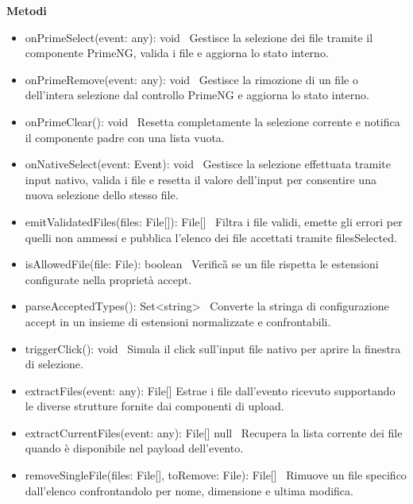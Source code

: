 \documentclass[a4paper,11pt]{article}
\begin{document}
\textbf{Metodi}

\begin{itemize}
\item onPrimeSelect(event: any): void \
Gestisce la selezione dei file tramite il componente PrimeNG, valida i file e aggiorna lo stato interno.

\item onPrimeRemove(event: any): void \
Gestisce la rimozione di un file o dell'intera selezione dal controllo PrimeNG e aggiorna lo stato interno.

\item onPrimeClear(): void \
Resetta completamente la selezione corrente e notifica il componente padre con una lista vuota.

\item onNativeSelect(event: Event): void \
Gestisce la selezione effettuata tramite input nativo, valida i file e resetta il valore dell'input per consentire una nuova selezione dello stesso file.

\item emitValidatedFiles(files: File[]): File[] \
Filtra i file validi, emette gli errori per quelli non ammessi e pubblica l'elenco dei file accettati tramite filesSelected.

\item isAllowedFile(file: File): boolean \
Verifica\G{} se un file rispetta le estensioni configurate nella proprietà accept.

\item parseAcceptedTypes(): Set<string> \
Converte la stringa di configurazione accept in un insieme di estensioni normalizzate e confrontabili.

\item triggerClick(): void \
Simula il click sull'input file nativo per aprire la finestra di selezione.

\item extractFiles(event: any): File[] 
Estrae i file dall'evento ricevuto supportando le diverse strutture fornite dai componenti di upload.

\item extractCurrentFiles(event: any): File[] \textbar{} null \
Recupera la lista corrente dei file quando è disponibile nel payload dell'evento.

\item removeSingleFile(files: File[], toRemove: File): File[] \
Rimuove un file specifico dall'elenco confrontandolo per nome, dimensione e ultima modifica.
\end{itemize}
\end{document}
